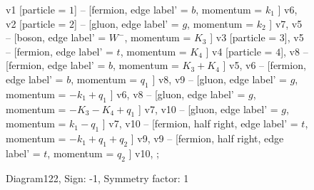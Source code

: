 \documentclass{revtex4}
\begin{document}
\begin{figure}[!htb]
\begin{center}
{    %
v1 [particle = \(1\)] -- [fermion, edge label' = \(b\), momentum = \(k_{1}\) ] v6, 
v2 [particle = \(2\)] -- [gluon, edge label' = \(g\), momentum = \(k_{2}\) ] v7, 
v5 -- [boson, edge label' = \(W^{-}\), momentum = \(K_{3}\) ] v3 [particle = \(3\)], 
v5 -- [fermion, edge label' = \(t\), momentum = \(K_{4}\) ] v4 [particle = \(4\)], 
v8 -- [fermion, edge label' = \(b\), momentum = \(K_{3} + K_{4}\) ] v5, 
v6 -- [fermion, edge label' = \(b\), momentum = \(q_{1}\) ] v8, 
v9 -- [gluon, edge label' = \(g\), momentum = \(-k_{1} + q_{1}\) ] v6, 
v8 -- [gluon, edge label' = \(g\), momentum = \(-K_{3} - K_{4} + q_{1}\) ] v7, 
v10 -- [gluon, edge label' = \(g\), momentum = \(k_{1} - q_{1}\) ] v7, 
v10 -- [fermion, half right, edge label' = \(t\), momentum = \(-k_{1} + q_{1} + q_{2}\) ] v9, 
v9 -- [fermion, half right, edge label' = \(t\), momentum = \(q_{2}\) ] v10, 
};
\end{center}
\caption{Diagram122, Sign: -1, Symmetry factor: 1}
\end{figure}
\newpage
\end{document}
